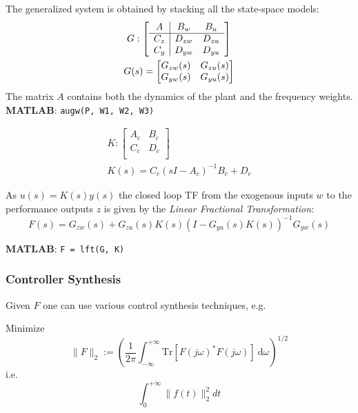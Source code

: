 The generalized system is obtained by stacking all the state-space models:
\begin{gather*}
    G : \left[
        \begin{array}{c|c c} %
            A   & B_w    & B_u    \\
            \hline %
            C_z & D_{zw} & D_{zu} \\
            C_y & D_{yw} & D_{yu}
        \end{array}
        \right]                        \\
    G(s) = \begin{bmatrix}
        G_{zw}(s) & G_{zu}(s) \\
        G_{yw}(s) & G_{yu}(s) \\
    \end{bmatrix}
\end{gather*}
The matrix $A$ contains both the dynamics of the plant and the frequency weights.\\
\textbf{MATLAB}: \texttt{augw(P, W1, W2, W3)}

\newpar{}
\begin{gather*}
    K : \left[
        \begin{array}{c|c} %
            A_c & B_c \\
            \hline %
            C_c & D_c \\
        \end{array}
        \right]                            \\
    K(s) = {C_c(sI-A_c)}^{-1}B_c+D_c
\end{gather*}

As $u(s)=K(s)y(s)$ the closed loop TF from the exogenous inputs $w$ to the performance outputs $z$ is given by the \textit{Linear Fractional Transformation}:
\begin{equation*}
    F(s) = G_{zw}(s) + G_{zu}(s)K(s){(I-G_{yu}(s)K(s))}^{-1}G_{yw}(s)
\end{equation*}

\textbf{MATLAB}: \texttt{F = lft(G, K)}

\subsubsection{Controller Synthesis}
Given $F$ one can use various control synthesis techniques, e.g.\
\newpar{}

Minimize
\begin{equation*}
    \|F\|_{2}:={\left(\frac{1}{2\pi}\int_{-\infty}^{+\infty}\mathrm{Tr}[{F(j\omega)}^{*}F(j\omega)]\mathrm{~d}\omega\right)}^{1/2}
\end{equation*}
i.e.\
\begin{equation*}
    \int_0^{+\infty}\|f(t)\|_2^2dt
\end{equation*}

